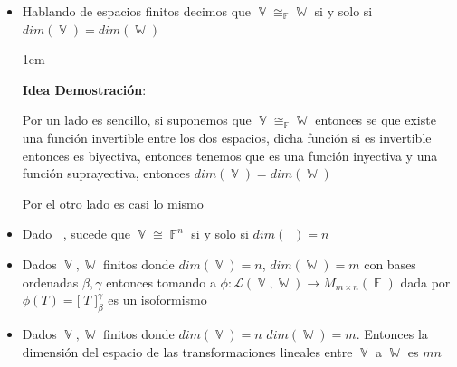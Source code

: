 \documentclass[12pt, fleqn]{report}                             %
\newenvironment{SmallIndentation}[1][0.75em]                    %
        {\begin{adjustwidth}{#1}{}\begin{footnotesize}}             %
        {\end{footnotesize}\end{adjustwidth}}                       %
\theoremstyle{break}                                            %
\DeclareMathOperator \GenericField {\mathbb{F}}                 %
\DeclareMathOperator \VectorSet    {\mathbb{V}}                 %
\DeclareMathOperator \SubVectorSet {\mathbb{W}}                 %
\DeclareMathOperator \VectorSpace  {\VectorSet_{\GenericField}} %
\newcommand{\BigBrackets}[1] {\Big[ \; #1 \; \Big]}             %
\begin{document}
                \begin{itemize}

                    \item
                        Hablando de espacios finitos decimos que
                        $\VectorSet \cong_{\GenericField} \SubVectorSet$ si y solo si 
                        $dim(\VectorSet) = dim(\SubVectorSet)$

                        \begin{SmallIndentation}[1em]
                            \textbf{Idea Demostración}:

                            Por un lado es sencillo, si suponemos que $\VectorSet \cong_{\GenericField} \SubVectorSet$
                            entonces se que existe una función invertible entre los dos espacios, dicha
                            función si es invertible entonces es biyectiva, entonces tenemos que
                            es una función inyectiva y una función suprayectiva, entonces
                            $dim(\VectorSet) = dim(\SubVectorSet)$

                            Por el otro lado es casi lo mismo
                        
                        \end{SmallIndentation}

                    \item
                        Dado $\VectorSpace$, sucede que $\VectorSet \cong \GenericField^n$ si y solo si
                        $dim(\VectorSpace) = n$ 

                    \item
                        Dados $\VectorSet, \SubVectorSet$ finitos donde $dim(\VectorSet) = n$,
                        $dim(\SubVectorSet) = m$ con bases ordenadas $\beta, \gamma$ entonces tomando
                        a $\phi : \mathscr{L}(\VectorSet, \SubVectorSet) \to M_{m \times n}(\GenericField)$
                        dada por $\phi(T) = \BigBrackets{T}_\beta^\gamma$ es un isoformismo

                    \item
                        Dados $\VectorSet, \SubVectorSet$ finitos donde $dim(\VectorSet) = n$
                        $dim(\SubVectorSet) = m$. Entonces la dimensión del espacio de las transformaciones
                        lineales entre $\VectorSet$ a $\SubVectorSet$ es $mn$


\end{itemize}
\end{document}
